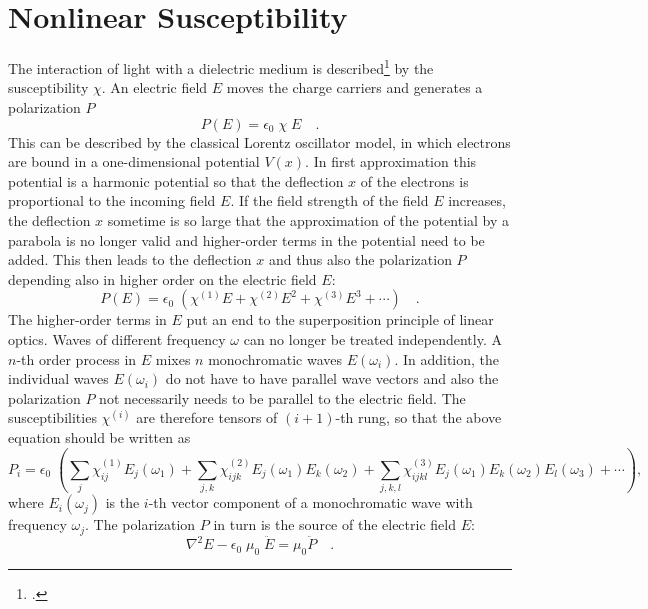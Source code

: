\section{Nonlinear Susceptibility}

The interaction of light with a dielectric medium is described\footcite{MilonniEberly1988,Yariv1989} by the  susceptibility $\chi$.
An electric field $E$ moves the
charge carriers and generates a polarization $P$
\begin{equation}
  P(E) = \epsilon_0 \; \chi \; E \quad.
\end{equation}
This can be described by the classical Lorentz oscillator model,
in which electrons are bound  in a one-dimensional potential $V(x)$. In first approximation this potential is a
harmonic potential so that the deflection
$x$ of the electrons is proportional to the incoming field $E$.
If the field strength of the field $E$ increases, the deflection
$x$ sometime is so large that the approximation of the potential by a
parabola is no longer valid and higher-order terms in the
potential need to be added. This then leads to the deflection
$x$ and thus also the polarization $P$ depending also in higher
order  on the electric field $E$:
\begin{equation}
  P(E) = \epsilon_0 \; \left( \chi^{(1)} E + \chi^{(2)} E^2 + \chi^{(3)}
  E^3 + \cdots \right)  \quad .
\end{equation}
The higher-order terms in $E$  put an end to the 
superposition principle of linear optics. Waves of different
frequency $\omega$ can no longer be treated independently.
A $n$-th order process in $E$ mixes $n$ monochromatic
waves $E(\omega_i)$. In addition, the individual waves
$E(\omega_i)$ do not have to have parallel wave vectors and also the
polarization $P$ not necessarily needs to be parallel to the electric field. The susceptibilities $\chi^{(i)}$ are therefore tensors of
$(i+1)$-th rung, so that the above equation
 should be written as
\begin{equation}
  P_i = \epsilon_0 \; \left( \sum_j \chi^{(1)}_{ij} E_j(\omega_1)
     + \sum_{j,k} \chi^{(2)}_{ijk} E_j(\omega_1) E_k(\omega_2) +
    \sum_{j,k,l} \chi^{(3)}_{ijkl} E_j(\omega_1) E_k(\omega_2) E_l(\omega_3) + \cdots \right)  ,
\end{equation}
where $E_i(\omega_j)$ is the $i$-th vector component of a
monochromatic wave with frequency $\omega_j$. The
polarization $P$ in turn is the source of the electric field $E$:
\begin{equation}
   \nabla^2 E - \epsilon_0 \; \mu_0 \; \ddot{E} = \mu_0 \ddot{P}  \quad .
   \label{eq_shg_wave equation}
\end{equation}

